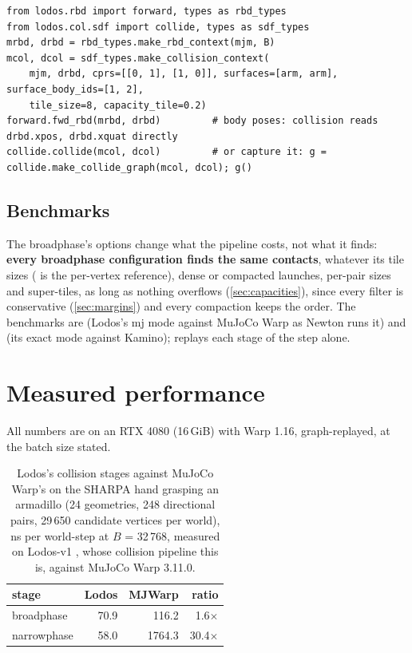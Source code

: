 \begin{lstlisting}
from lodos.rbd import forward, types as rbd_types
from lodos.col.sdf import collide, types as sdf_types
mrbd, drbd = rbd_types.make_rbd_context(mjm, B)
mcol, dcol = sdf_types.make_collision_context(
    mjm, drbd, cprs=[[0, 1], [1, 0]], surfaces=[arm, arm], surface_body_ids=[1, 2],
    tile_size=8, capacity_tile=0.2)
forward.fwd_rbd(mrbd, drbd)         # body poses: collision reads drbd.xpos, drbd.xquat directly
collide.collide(mcol, dcol)         # or capture it: g = collide.make_collide_graph(mcol, dcol); g()
\end{lstlisting}

\subsection{Benchmarks}\label{sec:bench}

The broadphase's options change what the pipeline costs, not what it finds: \textbf{every broadphase configuration finds the same contacts}, whatever its tile sizes ( is the per-vertex reference), dense or compacted launches, per-pair sizes and super-tiles, as long as nothing overflows (\cref{sec:capacities}), since every filter is conservative (\cref{sec:margins}) and every compaction keeps the order. The benchmarks are  (Lodos's mj mode against MuJoCo Warp as Newton runs it) and  (its exact mode against Kamino);  replays each stage of the step alone.

\section{Measured performance}\label{sec:measured}

All numbers are on an RTX 4080 (16\,GiB) with Warp 1.16, graph-replayed, at the batch size stated.

\begin{table}[t]
\centering
\caption{Lodos's collision stages against MuJoCo Warp's on the SHARPA hand grasping an armadillo (24 geometries, 248 directional pairs, 29\,650 candidate vertices per world), ns per world-step at $B$ = 32\,768, measured on Lodos-v1 \cite{lodosv1}, whose collision pipeline this is, against MuJoCo Warp 3.11.0.}
\label{tab:sharpa}
\small
\begin{tabularx}{\linewidth}{@{}Yrrr@{}}
\toprule
stage & Lodos & MJWarp & ratio \\
\midrule
broadphase & 70.9 & 116.2 & 1.6$\times$ \\
narrowphase & 58.0 & 1764.3 & 30.4$\times$ \\
\bottomrule
\end{tabularx}
\end{table}

